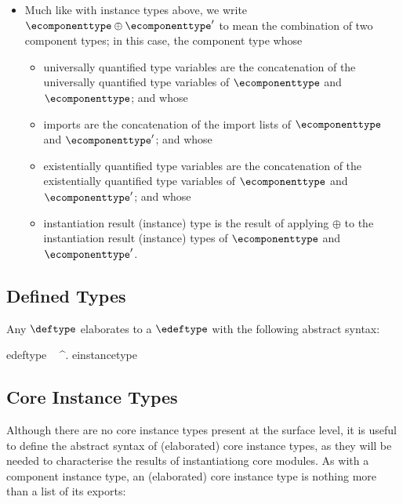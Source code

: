 \begin{itemize}
\item Much like with instance types above, we write
  $\ecomponenttype \oplus \ecomponenttype'$ to mean the combination of
  two component types; in this case, the component type whose
  \begin{itemize}
  \item universally quantified type variables are the concatenation of
    the universally quantified type variables of $\ecomponenttype$ and
    $\ecomponenttype$; and whose

  \item imports are the concatenation of the import lists of
    $\ecomponenttype$ and $\ecomponenttype'$; and whose

  \item existentially quantified type variables are the concatenation
    of the existentially quantified type variables of
    $\ecomponenttype$ and $\ecomponenttype'$; and whose

  \item instantiation result (instance) type is the result of applying
    $\oplus$ to the instantiation result (instance) types of
    $\ecomponenttype$ and $\ecomponenttype'$.
  \end{itemize}
\end{itemize}

\subsection{Defined Types}

Any $\deftype$ elaborates to a $\edeftype$ with the
following abstract syntax:

\begin{sum-production}{edeftype}
  \tyvar \alt
  \EDTRESOURCE~\rtidx \alt
  \evaltype \alt
  \efunctype \alt
  \ecomponenttype \alt
  \exists \boundedtyvar^\ast. einstancetype\\
\end{sum-production}

\subsection{Core Instance Types}

Although there are no core instance types present at the surface
level, it is useful to define the abstract syntax of (elaborated) core
instance types, as they will be needed to characterise the results of
instantiationg core modules. As with a component instance type, an
(elaborated) core instance type is nothing more than a list of its
exports:

